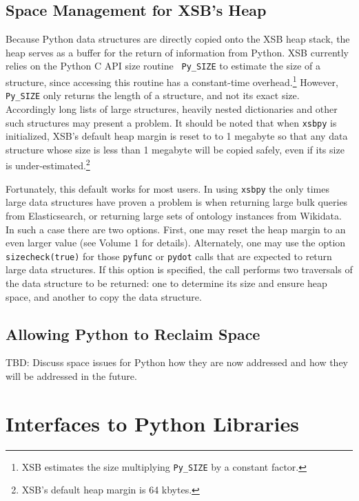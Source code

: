 \subsection{Space Management for XSB's Heap} \label{sec:xsbpy-memory}

Because Python data structures are directly copied onto the XSB heap
stack, the heap serves as a buffer for the return of information from
Python.  XSB currently relies on the Python C API size routine {\tt
  Py\_SIZE} to estimate the size of a structure, since accessing this
routine has a constant-time overhead.\footnote{XSB estimates the size
  multiplying {\tt Py\_SIZE} by a constant factor.}  However, {\tt
  Py\_SIZE} only returns the length of a structure, and not its exact
size.  Accordingly long lists of large structures, heavily nested
dictionaries and other such structures may present a problem.  It
should be noted that when {\tt xsbpy} is initialized, XSB's default
heap margin is reset to to 1 megabyte so that any data structure whose
size is less than 1 megabyte will be copied safely, even if its size
is under-estimated.\footnote{XSB's default heap margin is 64 kbytes.}

Fortunately, this default works for most users.  In using {\tt xsbpy}
the only times large data structures have proven a problem is when
returning large bulk queries from Elasticsearch, or returning large
sets of ontology instances from Wikidata.  In such a case there are
two options.  First, one may reset the heap margin to an even larger
value (see Volume 1 for details).  Alternately, one may use the option
{\tt sizecheck(true)} for those {\tt pyfunc} or {\tt pydot} calls that
are expected to return large data structures.  If this option is
specified, the call performs two traversals of the data structure to
be returned: one to determine its size and ensure heap space, and another
to copy the data structure.

\subsection{Allowing Python to Reclaim Space}
%
TBD: Discuss space issues for Python how they are now addressed and
how they will be addressed in the future.

\section{Interfaces to Python Libraries}

